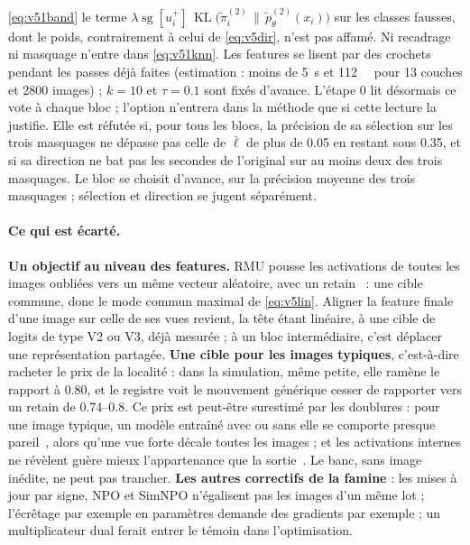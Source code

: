 \documentclass[11pt,a4paper]{article}
\newcommand{\KL}{\operatorname{KL}}
\begin{document}
\eqref{eq:v51band} le terme $\lambda\operatorname{sg}[u_i^+]\,\KL\bigl(\tilde\pi^{(2)}_i\,\|\,\tilde
p^{(2)}_\theta(x_i)\bigr)$ sur les classes fausses, dont le poids, contrairement à celui de
\eqref{eq:v5dir}, n'est pas affamé. Ni recadrage ni masquage n'entre dans \eqref{eq:v51knn}. Les
features se lisent par des crochets pendant les passes déjà faites (estimation : moins de
\SI{5}{\second} et \SI{112}{\mega\byte} pour 13 couches et 2800 images) ; $k=10$ et $\tau=\num{0.1}$
sont fixés d'avance. L'étape 0 lit désormais ce vote à chaque bloc ; l'option n'entrera dans la
méthode que si cette lecture la justifie. Elle est
réfutée si, pour tous les blocs, la précision de sa sélection sur les trois masquages ne dépasse pas
celle de $\bar\ell$ de plus de \num{0.05} en restant sous \num{0.35}, et si sa direction ne bat pas
les secondes de l'original sur au moins deux des trois masquages. Le bloc se choisit d'avance, sur la
précision moyenne des trois masquages ; sélection et direction se jugent séparément.

\paragraph{Ce qui est écarté.} \textbf{Un objectif au niveau des features.} RMU pousse les
activations de toutes les images oubliées vers un même vecteur aléatoire, avec un
retain~\cite{li2024wmdp} : une cible commune, donc le mode commun maximal de \eqref{eq:v5lin}. Aligner
la feature finale d'une image sur celle de ses vues revient, la tête étant linéaire, à une cible de
logits de type V2 ou V3, déjà mesurée ; à un bloc intermédiaire, c'est déplacer une représentation
partagée. \textbf{Une cible pour les images typiques}, c'est-à-dire racheter le prix de la localité :
dans la simulation, même petite, elle ramène le rapport à \num{0.80}, et le registre voit le mouvement
générique cesser de rapporter vers un retain de \numrange{0.74}{0.8}. Ce prix est peut-être surestimé
par les doublures : pour une image typique, un modèle entraîné avec ou sans elle se comporte presque
pareil~\cite{carlini2022}, alors qu'une vue forte décale toutes les images ; et les activations
internes ne révèlent guère mieux l'appartenance que la sortie~\cite{nasr2019comprehensive}. Le banc,
sans image inédite, ne peut pas trancher. \textbf{Les autres correctifs de la famine} : les mises à
jour par signe, NPO et SimNPO n'égalisent pas les images d'un même lot ; l'écrêtage par exemple en
paramètres demande des gradients par exemple ; un multiplicateur dual ferait entrer le témoin dans
l'optimisation.
\end{document}

